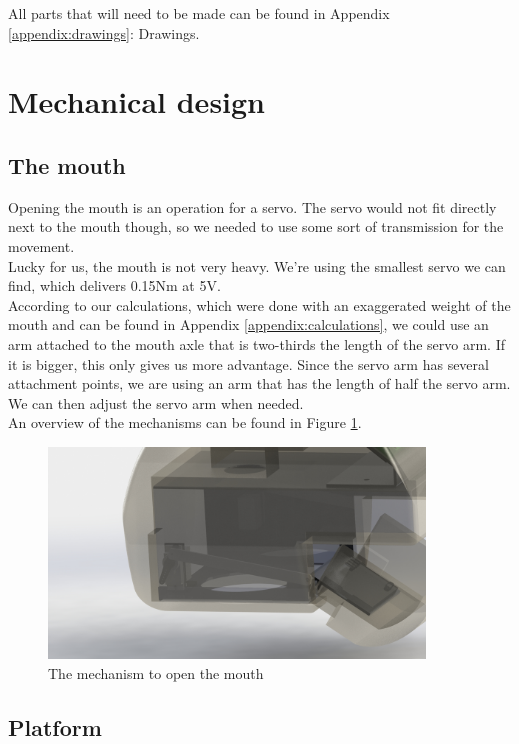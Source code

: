 \documentclass[11pt,twoside,a4paper]{report}
\begin{document}
All parts that will need to be made can be found in Appendix \ref{appendix:drawings}: Drawings. 
\section{Mechanical design}

\subsection{The mouth}
Opening the mouth is an operation for a servo. The servo would not fit directly next to the mouth though, so we needed to use some sort of transmission for the movement.\\
Lucky for us, the mouth is not very heavy. We\rq{}re using the smallest servo we can find, which delivers 0.15Nm at 5V.\\
According to our calculations, which were done with an exaggerated weight of the mouth and can be found in Appendix \ref{appendix:calculations}, we could use an arm attached to the mouth axle that is two-thirds the length of the servo arm. If it is bigger, this only gives us more advantage. Since the servo arm has several attachment points, we are using an arm that has the length of half the servo arm. We can then adjust the servo arm when needed.\\
An overview of the mechanisms can be found in Figure \ref{fig:headmech}.
\begin{figure}[H]
\begin{center}
\includegraphics[width = 10cm]{Images/headmechanism.jpg}
\caption{The mechanism to open the mouth}
\label{fig:headmech}
\end{center}
\end{figure}

\subsection{Platform}
\end{document}
